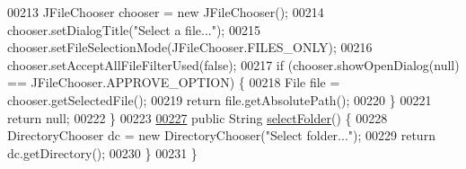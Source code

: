 \begin{DoxyCode}
00213     JFileChooser chooser = \textcolor{keyword}{new} JFileChooser();
00214     chooser.setDialogTitle(\textcolor{stringliteral}{"Select a file..."});
00215     chooser.setFileSelectionMode(JFileChooser.FILES\_ONLY);
00216     chooser.setAcceptAllFileFilterUsed(\textcolor{keyword}{false});
00217     \textcolor{keywordflow}{if} (chooser.showOpenDialog(null) == JFileChooser.APPROVE\_OPTION) \{
00218       File file = chooser.getSelectedFile();
00219       \textcolor{keywordflow}{return} file.getAbsolutePath();
00220     \}
00221     \textcolor{keywordflow}{return} null;
00222   \} 
00223 
\hypertarget{_file_manager_8java_source_l00227}{}\hyperlink{classfunctions_1_1_file_manager_af19fd6734ccb746c4f276c83b6a47689}{00227}   \textcolor{keyword}{public} String \hyperlink{classfunctions_1_1_file_manager_af19fd6734ccb746c4f276c83b6a47689}{selectFolder}() \{
00228     DirectoryChooser dc = \textcolor{keyword}{new} DirectoryChooser(\textcolor{stringliteral}{"Select folder..."});
00229     \textcolor{keywordflow}{return} dc.getDirectory();
00230   \}  
00231 \}
\end{DoxyCode}
